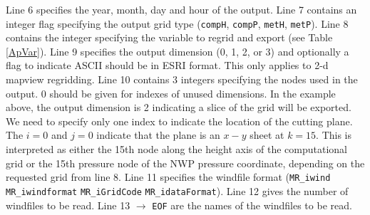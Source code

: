 \documentclass[11pt]{article}   %
\begin{document}
Line 6 specifies the year, month, day and hour of the output.
Line 7 contains an integer flag specifying the output grid type
(\texttt{compH}, \texttt{compP}, \texttt{metH}, \texttt{metP}).
Line 8 contains the integer specifying the variable to regrid and export (see Table \ref{ApVar}).
Line 9 specifies the output dimension (0, 1, 2, or 3) and optionally a flag to indicate ASCII should be
in ESRI format.  This only applies to 2-d mapview regridding.
Line 10 contains 3 integers specifying the nodes used in the output. 0 should be given for indexes of unused
dimensions.  In the example above, the output dimension is 2 indicating a slice of the grid will be
exported.  We need to specify only one index to indicate the location of the cutting plane.  The $i=0$
and $j=0$ indicate that the plane is an $x-y$ sheet at $k=15$.  This is interpreted as either the 15th node
along the height axis of the computational grid or the 15th pressure node of the NWP pressure coordinate,
depending on the requested grid from line 8.
Line 11 specifies the windfile format (\texttt{MR\_iwind} \texttt{MR\_iwindformat}
\texttt{MR\_iGridCode} \texttt{MR\_idataFormat}).
Line 12 gives the number of windfiles to be read.
Line 13 $\rightarrow$ \texttt{EOF} are the names of the windfiles to be read.
\end{document}
